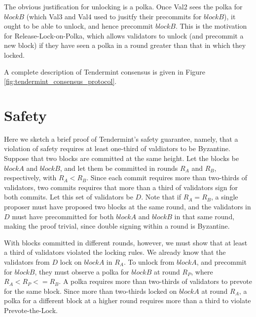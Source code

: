 The obvious justification for unlocking is a polka. Once Val2 sees the polka for $blockB$ (which Val3 and Val4 used to jusitfy their precommits for $blockB$), 
it ought to be able to unlock, and hence precommit $blockB$.
This is the motivation for Release-Lock-on-Polka, which allows validators to unlock (and precommit a new block) if they have seen a polka in a round greater than that in which they locked.

A complete description of Tendermint consensus is given in Figure \ref{fig:tendermint_consensus_protocol}.

\section{Safety}

Here we sketch a brief proof of Tendermint's safety guarantee, namely, 
that a violation of safety requires at least one-third of valdiators to be Byzantine.
Suppose that two blocks are committed at the same height.
Let the blocks be $blockA$ and $blockB$, and let them be committed in rounds $R_A$ and $R_B$, respectively, with $R_A < R_B$.
Since each commit requires more than two-thirds of validators, 
two commits requires that more than a third of validators sign for both commits.
Let this set of validators be $D$.
Note that if $R_A = R_B$, a single proposer must have proposed two blocks at the same round, 
and the validators in $D$ must have precommitted for both $blockA$ and $blockB$ in that same round, 
making the proof trivial, since double signing within a round is Byzantine.

With blocks committed in different rounds, however, 
we must show that at least a third of validators violated the locking rules.
We already know that the validators from $D$ lock on $blockA$ in $R_A$.
To unlock from $blockA$, and precommit for $blockB$, 
they must observe a polka for $blockB$ at round $R_P$, where $R_A < R_P <= R_B$.
A polka requires more than two-thirds of validators to prevote for the same block.
Since more than two-thirds locked on $blockA$ at round $R_A$, 
a polka for a different block at a higher round requires more than a third to violate Prevote-the-Lock.

%
%
%


